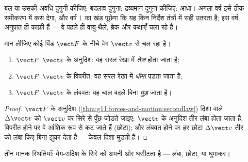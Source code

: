 \begin{remark}
बल या उसकी अवधि दुगुनी कीजिए: बदलाव दुगुना; द्रव्यमान दुगुना कीजिए:
आधा। अगला वर्ष इसे ठीक समीकरण में कस देगा, और वर्ष 1 का खंड पूछेगा कि यह किन
निर्देश तंत्रों में सही उतरता है; इस वर्ष अनुपात ही काफ़ी हैं --- वे पहले ही
वायु-थैले, ब्रेक और कक्षाएँ चला रहे हैं।
\end{remark}

\begin{proposition}[तीन मानक स्थितियाँ]\label{prop:g11:forces-and-motion:cases}
मान लीजिए कोई पिंड  $\vect F$ के नीचे वेग $\vect v$ से चल रहा
है।
\begin{enumerate}
  \item $\vect F$ $\vect v$ के अनुदिश: वह सरल रेखा में \emph{तेज़} होता जाता है;
  \item $\vect F$ $\vect v$ के विपरीत: वह सरल रेखा में \emph{धीमा} पड़ता जाता है;
  \item $\vect F$ $\vect v$ के लंबवत: वह चाल बदले बिना \emph{मुड़} जाता है।
\end{enumerate}
\end{proposition}

\begin{proof}
$\vect F$ के अनुदिश (\cref{thm:g11:forces-and-motion:secondlaw}) दिशा वाले $\Delta\vect v$ को $\vect v$ पर सिरे से पूँछ जोड़ते
जाइए: $\vect v$ के अनुदिश तीर लंबा होता जाता है; विपरीत होने पर वे आंशिक रूप से
कट जाते हैं (छोटा); और लंबवत होने पर हर छोटा $\Delta \vect v$ तीर को लंबा किए बिना
झुका देता है --- केवल दिशा मुड़ती है।
\end{proof}

\begin{omfigure}
\qquad
{}
\qquad
{}

{\small तीन मानक स्थितियाँ:  वेग-सदिश के सिरे को अपनी ओर
घसीटता है --- लंबा, छोटा, या घुमाकर।}
\end{omfigure}

